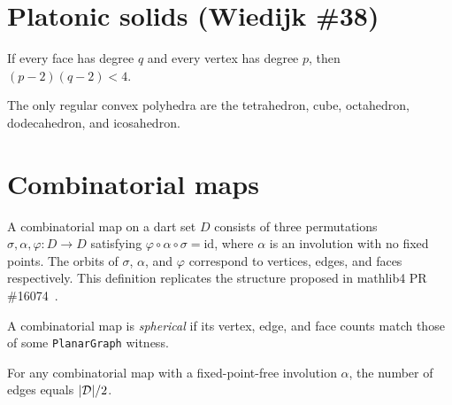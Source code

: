 \section{Platonic solids (Wiedijk \#38)}

\begin{theorem}\label{thm:platonic_constraint}
\leanok
{}
If every face has degree $q$ and every vertex has degree $p$, then
$(p-2)(q-2) < 4$.
\end{theorem}

\begin{theorem}\label{thm:platonic_classification}
\leanok
{}
The only regular convex polyhedra are the tetrahedron, cube, octahedron,
dodecahedron, and icosahedron.
\end{theorem}

\section{Combinatorial maps}

\begin{definition}[CombinatorialMap]\label{def:cmap}
\leanok
A combinatorial map on a dart set $D$ consists of three permutations
$\sigma, \alpha, \varphi : D \to D$ satisfying $\varphi \circ \alpha \circ \sigma = \text{id}$,
where $\alpha$ is an involution with no fixed points.
The orbits of $\sigma$, $\alpha$, and $\varphi$ correspond to vertices,
edges, and faces respectively.
This definition replicates the structure proposed in mathlib4 PR \#16074~\cite{mathlib4pr16074}.
\end{definition}

\begin{definition}[IsSpherical]\label{def:spherical}
\leanok
{}
A combinatorial map is \emph{spherical} if its vertex, edge, and face
counts match those of some \texttt{PlanarGraph} witness.
\end{definition}

\begin{theorem}\label{thm:edge_count}
\leanok
{}
For any combinatorial map with a fixed-point-free involution $\alpha$,
the number of edges equals $|\mathcal{D}|/2$.
\end{theorem}

